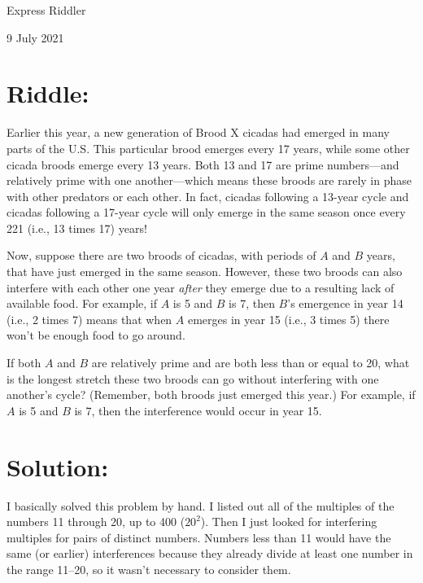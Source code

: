 \documentclass{article}
\begin{document}
\pagestyle{empty} %

\begin{center}
{\LARGE Express Riddler}

\vspace{0.15in}

{\Large 9 July 2021}
\end{center}


\section*{Riddle:}

Earlier this year, a new generation of Brood X cicadas had emerged in many parts of the U.S.
This particular brood emerges every 17 years, while some other cicada broods emerge every 13 years.
Both 13 and 17 are prime numbers---and relatively prime with one another---which means these broods are rarely in phase with other predators or each other.
In fact, cicadas following a 13-year cycle and cicadas following a 17-year cycle will only emerge in the same season once every 221 (i.e., 13 times 17) years!

Now, suppose there are two broods of cicadas, with periods of $A$ and $B$ years, that have just emerged in the same season.
However, these two broods can also interfere with each other one year \textit{after} they emerge due to a resulting lack of available food.
For example, if $A$ is 5 and $B$ is 7, then $B$'s emergence in year 14 (i.e., 2 times 7) means that when $A$ emerges in year 15 (i.e., 3 times 5) there won't be enough food to go around.

If both $A$ and $B$ are relatively prime and are both less than or equal to 20, what is the longest stretch these two broods can go without interfering with one another's cycle?
(Remember, both broods just emerged this year.)
For example, if $A$ is 5 and $B$ is 7, then the interference would occur in year 15.


\section*{Solution:}

I basically solved this problem by hand.
I listed out all of the multiples of the numbers 11 through 20, up to 400 ($20^{2}$).
Then I just looked for interfering multiples for pairs of distinct numbers.
Numbers less than 11 would have the same (or earlier) interferences because they already divide at least one number in the range 11--20, so it wasn't necessary to consider them.
\end{document}
